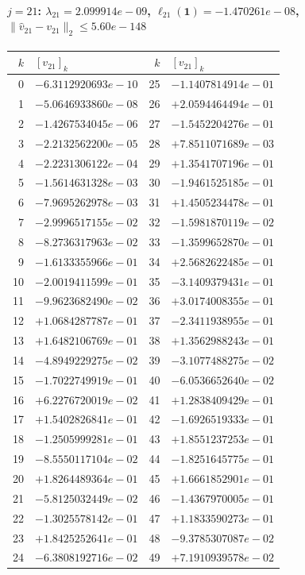 \documentclass[11pt]{article}
\begin{document}
\paragraph{$j = 21$: $\lambda_{21} = 2.099914e-09$, \quad $\ell_{21}(\mathbf{1}) = -1.470261e-08$, \quad $\|\hat{v}_{21} - v_{21}\|_2 \leq 5.60e-148$}
\begin{center}
{\footnotesize
\begin{tabular}{r@{\;\;}l@{\quad}r@{\;\;}l}
\toprule
$k$ & $[v_{21}]_k$ & $k$ & $[v_{21}]_k$ \\
\midrule
0 & $-6.3112920693e-10$ & 25 & $-1.1407814914e-01$ \\
1 & $-5.0646933860e-08$ & 26 & $+2.0594464494e-01$ \\
2 & $-1.4267534045e-06$ & 27 & $-1.5452204276e-01$ \\
3 & $-2.2132562200e-05$ & 28 & $+7.8511071689e-03$ \\
4 & $-2.2231306122e-04$ & 29 & $+1.3541707196e-01$ \\
5 & $-1.5614631328e-03$ & 30 & $-1.9461525185e-01$ \\
6 & $-7.9695262978e-03$ & 31 & $+1.4505234478e-01$ \\
7 & $-2.9996517155e-02$ & 32 & $-1.5981870119e-02$ \\
8 & $-8.2736317963e-02$ & 33 & $-1.3599652870e-01$ \\
9 & $-1.6133355966e-01$ & 34 & $+2.5682622485e-01$ \\
10 & $-2.0019411599e-01$ & 35 & $-3.1409379431e-01$ \\
11 & $-9.9623682490e-02$ & 36 & $+3.0174008355e-01$ \\
12 & $+1.0684287787e-01$ & 37 & $-2.3411938955e-01$ \\
13 & $+1.6482106769e-01$ & 38 & $+1.3562988243e-01$ \\
14 & $-4.8949229275e-02$ & 39 & $-3.1077488275e-02$ \\
15 & $-1.7022749919e-01$ & 40 & $-6.0536652640e-02$ \\
16 & $+6.2276720019e-02$ & 41 & $+1.2838409429e-01$ \\
17 & $+1.5402826841e-01$ & 42 & $-1.6926519333e-01$ \\
18 & $-1.2505999281e-01$ & 43 & $+1.8551237253e-01$ \\
19 & $-8.5550117104e-02$ & 44 & $-1.8251645775e-01$ \\
20 & $+1.8264489364e-01$ & 45 & $+1.6661852901e-01$ \\
21 & $-5.8125032449e-02$ & 46 & $-1.4367970005e-01$ \\
22 & $-1.3025578142e-01$ & 47 & $+1.1833590273e-01$ \\
23 & $+1.8425252641e-01$ & 48 & $-9.3785307087e-02$ \\
24 & $-6.3808192716e-02$ & 49 & $+7.1910939578e-02$ \\
\bottomrule
\end{tabular}
}
\end{center}
\end{document}
